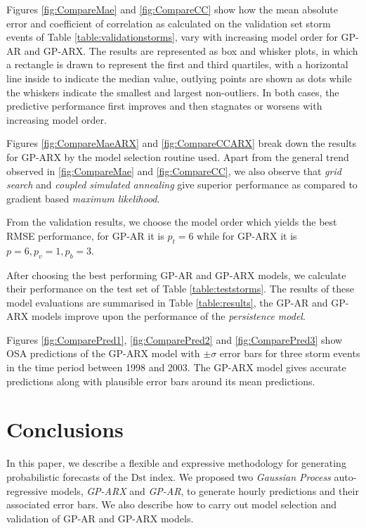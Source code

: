 Figures \ref{fig:CompareMae} and \ref{fig:CompareCC} show how the mean absolute error and coefficient of correlation as calculated on the validation set storm events of Table \ref{table:validationstorms}, vary with increasing model order for GP-AR and GP-ARX. The results are represented as box and whisker plots, in which a rectangle is drawn to represent the first and third quartiles, with a horizontal line inside to indicate the median value, outlying points are shown as dots while the whiskers indicate the smallest and largest non-outliers. In both cases, the predictive performance first improves and then stagnates or worsens with increasing model order. 

Figures \ref{fig:CompareMaeARX} and \ref{fig:CompareCCARX} break down the results for GP-ARX by the model selection routine used. Apart from the general trend observed in \ref{fig:CompareMae} and \ref{fig:CompareCC}, we also observe that \emph{grid search} and \emph{coupled simulated annealing} give superior performance as compared to gradient based \emph{maximum likelihood}.

From the validation results, we choose the model order which yields the best RMSE performance, for GP-AR it is $p_t = 6$ while for GP-ARX it is $p = 6, p_v = 1, p_b = 3$.

After choosing the best performing GP-AR and GP-ARX models, we calculate their performance on the test set of Table \ref{table:teststorms}. The results of these model evaluations are summarised in Table \ref{table:results}, the GP-AR and GP-ARX models improve upon the performance of the \emph{persistence model}.

Figures \ref{fig:ComparePred1}, \ref{fig:ComparePred2} and \ref{fig:ComparePred3} show OSA predictions of the GP-ARX model with $\pm \sigma$ error bars for three storm events in the time period between 1998 and 2003. The GP-ARX model gives accurate predictions along with plausible error bars around its mean predictions.

\section{Conclusions}

In this paper, we describe a flexible and expressive methodology for generating probabilistic forecasts of the $ \mathrm{Dst}$ index. We proposed two \emph{Gaussian Process} auto-regressive models, \emph{GP-ARX} and \emph{GP-AR}, to generate hourly predictions and their associated error bars. We also describe how to carry out model selection and validation of GP-AR and GP-ARX models.


